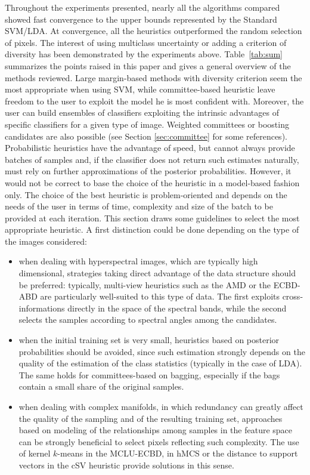 \label{sec:disc}
Throughout the experiments presented, nearly all the  algorithms compared showed fast convergence to the upper bounds represented  by the Standard SVM/LDA. At convergence, all the heuristics outperformed the random selection of pixels.  The interest of using multiclass uncertainty or adding a criterion of diversity has been demonstrated by the experiments above. Table~\ref{tab:sum} summarizes the points raised in this paper and gives a general overview of the methods reviewed. 
Large margin-based methods with diversity criterion seem the most appropriate when using SVM, while committee-based heuristic leave freedom to the user to exploit the model he is most confident with. Moreover, the user can build ensembles of classifiers exploiting the intrinsic advantages of specific classifiers for a given type of image.  Weighted committees or boosting candidates are also possible (see Section \ref{sec:committee} for some references). Probabilistic heuristics have the advantage of speed, but cannot always provide batches of samples and, if the classifier does not return  such estimates naturally, must rely on further approximations of the posterior probabilities.
However, it would not be correct to base the choice of the heuristic in a model-based fashion only. The choice of the best heuristic is problem-oriented and depends on the needs of the user in terms of time, complexity and size of the batch to be provided at each iteration. 
This section draws some guidelines to select the most appropriate heuristic. 
A first distinction could be done depending on the type of the images considered: 
\begin{itemize}
\item[-] when dealing with hyperspectral images, which are typically high dimensional, strategies taking direct advantage of the data structure should be preferred: typically, multi-view heuristics such as the AMD or the ECBD-ABD are particularly well-suited to this type of data. The first exploits cross-informations directly in the space of the spectral bands, while the second selects the samples according to spectral angles among the candidates.
\item[-] when the initial training set is very small, heuristics based on posterior probabilities should be avoided, since such estimation strongly depends on the quality of the estimation of the class statistics (typically in the case of LDA). The same holds for committees-based on bagging, especially if the bags contain a small share of the original samples.
\item[-] when dealing with complex manifolds, in which redundancy can greatly affect the quality of the sampling and of the resulting training set, approaches based on modeling of the relationships among samples in the feature space can be strongly beneficial to select pixels reflecting such complexity. The use of kernel $k$-means in the MCLU-ECBD, in hMCS or the distance to support vectors in the cSV heuristic provide solutions in this sense.
\end{itemize}
